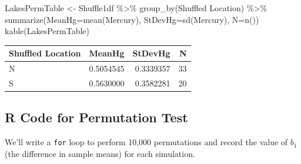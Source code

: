 \documentclass[
  letterpaper,
  DIV=11,
  numbers=noendperiod]{scrreprt}
\newenvironment{Shaded}{\begin{snugshade}}{\end{snugshade}}
\newcommand{\AttributeTok}[1]{\textcolor[rgb]{0.40,0.45,0.13}{#1}}
\newcommand{\FunctionTok}[1]{\textcolor[rgb]{0.28,0.35,0.67}{#1}}
\newcommand{\NormalTok}[1]{\textcolor[rgb]{0.00,0.23,0.31}{#1}}
\newcommand{\OtherTok}[1]{\textcolor[rgb]{0.00,0.23,0.31}{#1}}
\newcommand{\SpecialCharTok}[1]{\textcolor[rgb]{0.37,0.37,0.37}{#1}}
\newcommand{\StringTok}[1]{\textcolor[rgb]{0.13,0.47,0.30}{#1}}
\begin{document}
\begin{Shaded}
\begin{Highlighting}[]
\NormalTok{LakesPermTable }\OtherTok{\textless{}{-}}\NormalTok{ Shuffle1df }\SpecialCharTok{\%\textgreater{}\%} \FunctionTok{group\_by}\NormalTok{(}\StringTok{\textasciigrave{}}\AttributeTok{Shuffled Location}\StringTok{\textasciigrave{}}\NormalTok{) }\SpecialCharTok{\%\textgreater{}\%} \FunctionTok{summarize}\NormalTok{(}\AttributeTok{MeanHg=}\FunctionTok{mean}\NormalTok{(Mercury), }\AttributeTok{StDevHg=}\FunctionTok{sd}\NormalTok{(Mercury),  }\AttributeTok{N=}\FunctionTok{n}\NormalTok{())}
\FunctionTok{kable}\NormalTok{(LakesPermTable)}
\end{Highlighting}
\end{Shaded}

\begin{longtable}[]{@{}lrrr@{}}
\toprule\noalign{}
Shuffled Location & MeanHg & StDevHg & N \\
\midrule\noalign{}
\endhead
\bottomrule\noalign{}
\endlastfoot
N & 0.5054545 & 0.3339357 & 33 \\
S & 0.5630000 & 0.3582281 & 20 \\
\end{longtable}

\subsection{R Code for Permutation
Test}\label{r-code-for-permutation-test}

We'll write a \texttt{for} loop to perform 10,000 permutations and
record the value of \(b_1\) (the difference in sample means) for each
simulation.
\end{document}
